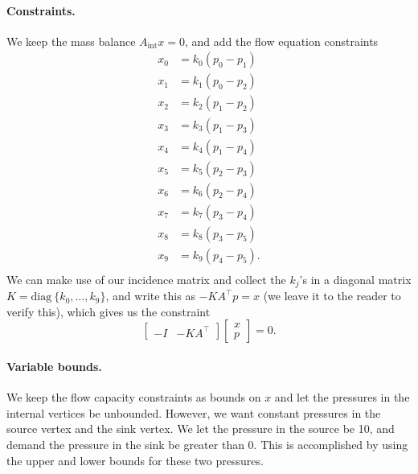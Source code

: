 \paragraph{Constraints.} We keep the mass balance $A_{\mathrm{int}}x=0$, and add the flow equation constraints
\begin{align*}
x_0 &= k_0(p_0 - p_1) \\
x_1 &= k_1(p_0 - p_2) \\
x_2 &= k_2(p_1 - p_2) \\
x_3 &= k_3(p_1 - p_3) \\
x_4 &= k_4(p_1 - p_4) \\
x_5 &= k_5(p_2 - p_3) \\
x_6 &= k_6(p_2 - p_4) \\
x_7 &= k_7(p_3 - p_4) \\
x_8 &= k_8(p_3 - p_5) \\
x_9 &= k_9(p_4 - p_5). \\
\end{align*}
We can make use of our incidence matrix and collect the $k_j$'s in a diagonal matrix $K = \mathrm{diag}\ \lbrace k_0, \dots, k_9 \rbrace$, and write this as $-K A^\top p = x$ (we leave it to the reader to verify this), which gives us the constraint
\[
\begin{bmatrix}  -I & -K A^\top \end{bmatrix} \begin{bmatrix} x \\ p \end{bmatrix} = 0.
\]

\paragraph{Variable bounds.} We keep the flow capacity constraints as bounds on $x$ and let the pressures in the internal vertices be unbounded. However, we want constant pressures in the source vertex and the sink vertex. We let the pressure in the source be 10, and demand the pressure in the sink be greater than 0. This is accomplished by using the upper and lower bounds for these two pressures.


